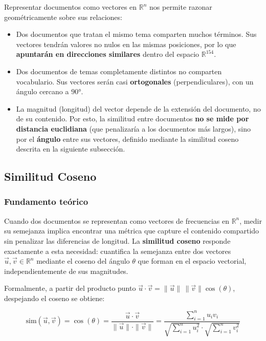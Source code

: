 Representar documentos como vectores en $\mathbb{R}^n$ nos permite razonar geométricamente sobre sus relaciones:

\begin{itemize}
    \item Dos documentos que tratan el mismo tema comparten muchos términos. Sus vectores tendrán valores no nulos en las mismas posiciones, por lo que \textbf{apuntarán en direcciones similares} dentro del espacio $\mathbb{R}^{154}$.
    \item Dos documentos de temas completamente distintos no comparten vocabulario. Sus vectores serán casi \textbf{ortogonales} (perpendiculares), con un ángulo cercano a $90°$.
    \item La magnitud (longitud) del vector depende de la extensión del documento, no de su contenido. Por esto, la similitud entre documentos \textbf{no se mide por distancia euclidiana} (que penalizaría a los documentos más largos), sino por el \textbf{ángulo} entre sus vectores, definido mediante la similitud coseno descrita en la siguiente subsección.
\end{itemize}

\subsection{Similitud Coseno}

\subsubsection{Fundamento teórico}

Cuando dos documentos se representan como vectores de frecuencias en $\mathbb{R}^n$, medir su semejanza implica encontrar una métrica que capture el contenido compartido sin penalizar las diferencias de longitud. La \textbf{similitud coseno} responde exactamente a esta necesidad: cuantifica la semejanza entre dos vectores $\vec{u}, \vec{v} \in \mathbb{R}^n$ mediante el coseno del ángulo $\theta$ que forman en el espacio vectorial, independientemente de sus magnitudes.

Formalmente, a partir del producto punto $\vec{u} \cdot \vec{v} = \|\vec{u}\|\,\|\vec{v}\|\cos(\theta)$, despejando el coseno se obtiene:

\begin{equation}
\text{sim}(\vec{u}, \vec{v}) = \cos(\theta) = \frac{\vec{u} \cdot \vec{v}}{\|\vec{u}\| \cdot \|\vec{v}\|} = \frac{\displaystyle\sum_{i=1}^{n} u_i v_i}{\sqrt{\displaystyle\sum_{i=1}^{n} u_i^2} \cdot \sqrt{\displaystyle\sum_{i=1}^{n} v_i^2}}
\label{eq:coseno}
\end{equation}

